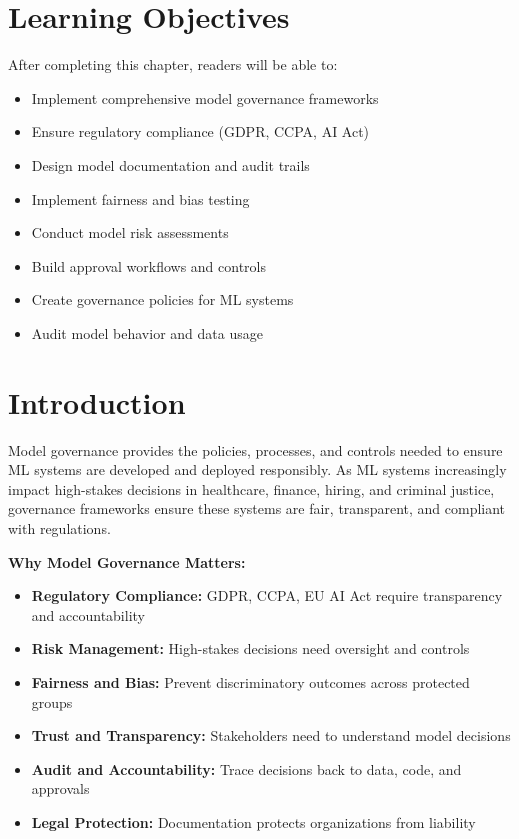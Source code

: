 \section{Learning Objectives}

After completing this chapter, readers will be able to:
\begin{itemize}
    \item Implement comprehensive model governance frameworks
    \item Ensure regulatory compliance (GDPR, CCPA, AI Act)
    \item Design model documentation and audit trails
    \item Implement fairness and bias testing
    \item Conduct model risk assessments
    \item Build approval workflows and controls
    \item Create governance policies for ML systems
    \item Audit model behavior and data usage
\end{itemize}

\section{Introduction}

Model governance provides the policies, processes, and controls needed to ensure ML systems are developed and deployed responsibly. As ML systems increasingly impact high-stakes decisions in healthcare, finance, hiring, and criminal justice, governance frameworks ensure these systems are fair, transparent, and compliant with regulations.

\textbf{Why Model Governance Matters:}

\begin{itemize}
    \item \textbf{Regulatory Compliance:} GDPR, CCPA, EU AI Act require transparency and accountability
    \item \textbf{Risk Management:} High-stakes decisions need oversight and controls
    \item \textbf{Fairness and Bias:} Prevent discriminatory outcomes across protected groups
    \item \textbf{Trust and Transparency:} Stakeholders need to understand model decisions
    \item \textbf{Audit and Accountability:} Trace decisions back to data, code, and approvals
    \item \textbf{Legal Protection:} Documentation protects organizations from liability
\end{itemize}

